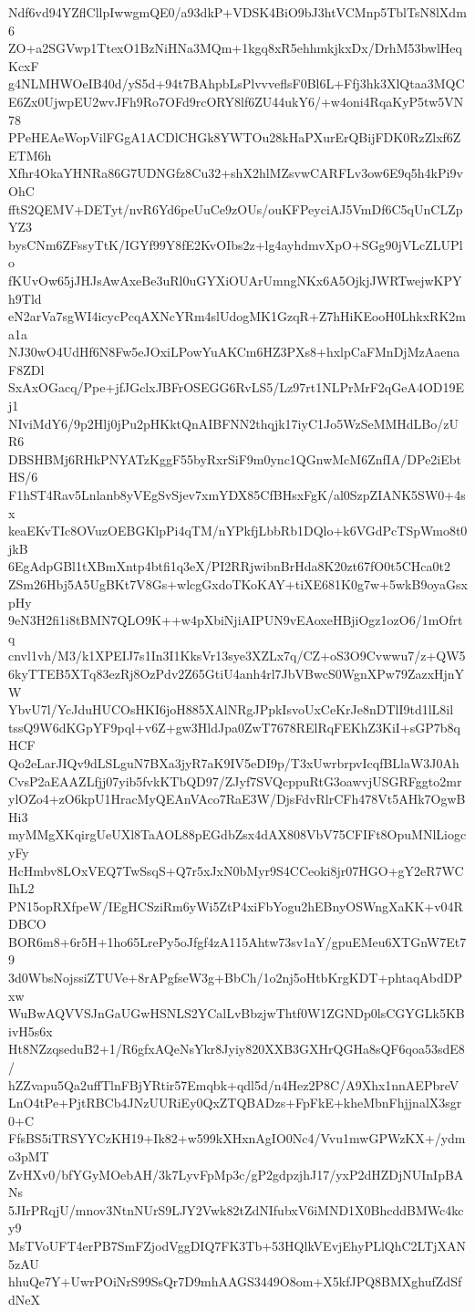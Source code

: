 Ndf6vd94YZflCllpIwwgmQE0/a93dkP+VDSK4BiO9bJ3htVCMnp5TblTsN8lXdm6
ZO+a2SGVwp1TtexO1BzNiHNa3MQm+1kgq8xR5ehhmkjkxDx/DrhM53bwlHeqKcxF
g4NLMHWOeIB40d/yS5d+94t7BAhpbLsPlvvveflsF0Bl6L+Ffj3hk3XlQtaa3MQC
E6Zx0UjwpEU2wvJFh9Ro7OFd9rcORY8lf6ZU44ukY6/+w4oni4RqaKyP5tw5VN78
PPeHEAeWopVilFGgA1ACDlCHGk8YWTOu28kHaPXurErQBijFDK0RzZlxf6ZETM6h
Xfhr4OkaYHNRa86G7UDNGfz8Cu32+shX2hlMZsvwCARFLv3ow6E9q5h4kPi9vOhC
fftS2QEMV+DETyt/nvR6Yd6peUuCe9zOUs/ouKFPeyciAJ5VmDf6C5qUnCLZpYZ3
bysCNm6ZFssyTtK/IGYf99Y8fE2KvOIbs2z+lg4ayhdmvXpO+SGg90jVLcZLUPlo
fKUvOw65jJHJsAwAxeBe3uRl0uGYXiOUArUmngNKx6A5OjkjJWRTwejwKPYh9Tld
eN2arVa7sgWI4icycPcqAXNcYRm4slUdogMK1GzqR+Z7hHiKEooH0LhkxRK2ma1a
NJ30wO4UdHf6N8Fw5eJOxiLPowYuAKCm6HZ3PXs8+hxlpCaFMnDjMzAaenaF8ZDl
SxAxOGacq/Ppe+jfJGclxJBFrOSEGG6RvLS5/Lz97rt1NLPrMrF2qGeA4OD19Ej1
NIviMdY6/9p2Hlj0jPu2pHKktQnAIBFNN2thqjk17iyC1Jo5WzSeMMHdLBo/zUR6
DBSHBMj6RHkPNYATzKggF55byRxrSiF9m0ync1QGnwMcM6ZnfIA/DPe2iEbtHS/6
F1hST4Rav5Lnlanb8yVEgSvSjev7xmYDX85CfBHsxFgK/al0SzpZIANK5SW0+4sx
keaEKvTIc8OVuzOEBGKlpPi4qTM/nYPkfjLbbRb1DQlo+k6VGdPcTSpWmo8t0jkB
6EgAdpGBl1tXBmXntp4btfi1q3eX/PI2RRjwibnBrHda8K20zt67fO0t5CHca0t2
ZSm26Hbj5A5UgBKt7V8Gs+wlcgGxdoTKoKAY+tiXE681K0g7w+5wkB9oyaGsxpHy
9eN3H2fi1i8tBMN7QLO9K++w4pXbiNjiAIPUN9vEAoxeHBjiOgz1ozO6/1mOfrtq
cnvl1vh/M3/k1XPEIJ7s1In3I1KksVr13sye3XZLx7q/CZ+oS3O9Cvwwu7/z+QW5
6kyTTEB5XTq83ezRj8OzPdv2Z65GtiU4anh4rl7JbVBwcS0WgnXPw79ZazxHjnYW
YbvU7l/YcJduHUCOsHKI6joH885XAlNRgJPpkIsvoUxCeKrJe8nDTlI9td1lL8il
tssQ9W6dKGpYF9pql+v6Z+gw3HldJpa0ZwT7678RElRqFEKhZ3KiI+sGP7b8qHCF
Qo2eLarJIQv9dLSLguN7BXa3jyR7aK9IV5eDI9p/T3xUwrbrpvIcqfBLlaW3J0Ah
CvsP2aEAAZLfjj07yib5fvkKTbQD97/ZJyf7SVQcppuRtG3oawvjUSGRFggto2mr
ylOZo4+zO6kpU1HracMyQEAnVAco7RaE3W/DjsFdvRlrCFh478Vt5AHk7OgwBHi3
myMMgXKqirgUeUXl8TaAOL88pEGdbZsx4dAX808VbV75CFIFt8OpuMNlLiogcyFy
HcHmbv8LOxVEQ7TwSsqS+Q7r5xJxN0bMyr9S4CCeoki8jr07HGO+gY2eR7WCIhL2
PN15opRXfpeW/IEgHCSziRm6yWi5ZtP4xiFbYogu2hEBnyOSWngXaKK+v04RDBCO
BOR6m8+6r5H+1ho65LrePy5oJfgf4zA115Ahtw73sv1aY/gpuEMeu6XTGnW7Et79
3d0WbsNojssiZTUVe+8rAPgfseW3g+BbCh/1o2nj5oHtbKrgKDT+phtaqAbdDPxw
WuBwAQVVSJnGaUGwHSNLS2YCalLvBbzjwThtf0W1ZGNDp0lsCGYGLk5KBivH5s6x
Ht8NZzqseduB2+1/R6gfxAQeNsYkr8Jyiy820XXB3GXHrQGHa8sQF6qoa53sdE8/
hZZvapu5Qa2uffTlnFBjYRtir57Emqbk+qdl5d/n4Hez2P8C/A9Xhx1nnAEPbreV
LnO4tPe+PjtRBCb4JNzUURiEy0QxZTQBADzs+FpFkE+kheMbnFhjjnalX3sgr0+C
FfsBS5iTRSYYCzKH19+Ik82+w599kXHxnAgIO0Nc4/Vvu1mwGPWzKX+/ydmo3pMT
ZvHXv0/bfYGyMOebAH/3k7LyvFpMp3c/gP2gdpzjhJ17/yxP2dHZDjNUInIpBANs
5JIrPRqjU/mnov3NtnNUrS9LJY2Vwk82tZdNIfubxV6iMND1X0BhcddBMWc4kcy9
MsTVoUFT4erPB7SmFZjodVggDIQ7FK3Tb+53HQlkVEvjEhyPLlQhC2LTjXAN5zAU
hhuQe7Y+UwrPOiNrS99SsQr7D9mhAAGS3449O8om+X5kfJPQ8BMXghufZdSfdNeX

